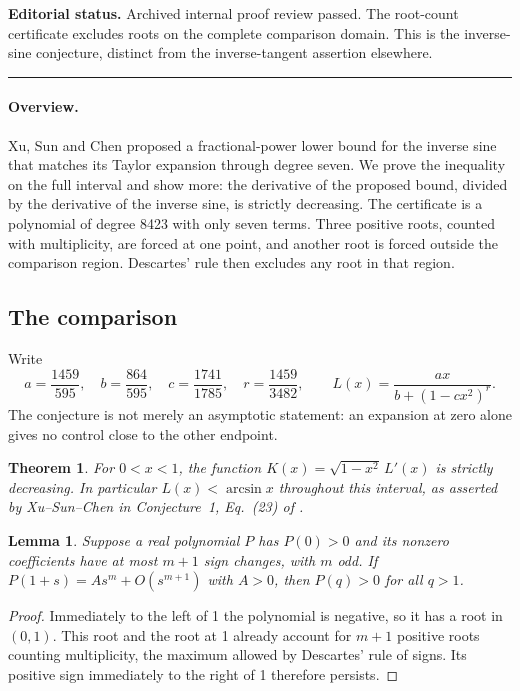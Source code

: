 \documentclass[11pt,a4paper]{article}
\newtheorem{SourceRcdMtheorem}{Theorem}
\newtheorem{SourceRcdMlemma}{Lemma}
\begin{document}
\noindent\textbf{Editorial status.} Archived internal proof review passed. The root-count certificate excludes roots on the complete comparison domain. This is the inverse-sine conjecture, distinct from the inverse-tangent assertion elsewhere.

\smallskip\hrule\medskip



\begingroup

\setcounter{equation}{0}
\renewcommand{\theequation}{\thesection.\arabic{equation}}
\renewcommand{\theHequation}{R23M.\arabic{equation}}
\paragraph{Overview.}
Xu, Sun and Chen proposed a fractional-power lower bound for the inverse sine
that matches its Taylor expansion through degree seven. We prove the
inequality on the full interval and show more: the derivative of the proposed
bound, divided by the derivative of the inverse sine, is strictly decreasing.
The certificate is a polynomial of degree 8423 with only seven terms.
Three positive roots, counted with multiplicity, are forced at one point,
and another root is forced outside the comparison region. Descartes' rule
then excludes any root in that region.


\subsection*{The comparison}
Write
\[
a=\frac{1459}{595},\quad b=\frac{864}{595},\quad
c=\frac{1741}{1785},\quad r=\frac{1459}{3482},\qquad
L(x)=\frac{a x}{b+(1-cx^2)^r}.
\]
The conjecture is not merely an asymptotic statement: an expansion at zero
alone gives no control close to the other endpoint.
\begin{SourceRcdMtheorem}\label{R23M:thm}
For $0<x<1$, the function $K(x)=\sqrt{1-x^2}\,L'(x)$ is strictly
decreasing. In particular $L(x)<\arcsin x$ throughout this interval, as
asserted by Xu--Sun--Chen in Conjecture~1, Eq.~(23) of \cite{R23M:XSC}.
\end{SourceRcdMtheorem}
\begin{SourceRcdMlemma}\label{R23M:lem}
Suppose a real polynomial $P$ has $P(0)>0$ and its nonzero coefficients
have at most $m+1$ sign changes, with $m$ odd. If $P(1+s)=A s^m+O(s^{m+1})$
with $A>0$, then $P(q)>0$ for all $q>1$.
\end{SourceRcdMlemma}
\begin{proof}
Immediately to the left of 1 the polynomial is negative, so it has a root
in $(0,1)$. This root and the root at 1 already account for $m+1$ positive
roots counting multiplicity, the maximum allowed by Descartes' rule of signs.
Its positive sign immediately to the right of 1 therefore persists.
\end{proof}
\end{document}
